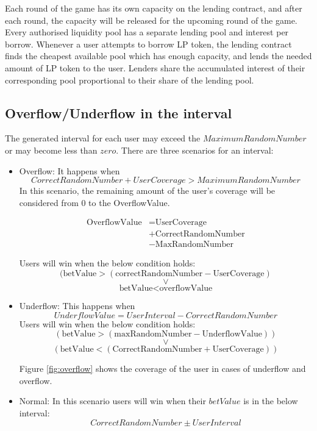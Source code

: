 \documentclass{article}
\begin{document}
Each round of the game has its own capacity on the lending contract, and after each round, the capacity will be released for the upcoming round of the game. Every authorised liquidity pool has a separate lending pool and interest per borrow. Whenever a user attempts to borrow LP token, the lending contract finds the cheapest available pool which has enough capacity, and lends the needed amount of LP token to the user.
Lenders share the accumulated interest of their corresponding pool proportional to their share of the lending pool.

\subsection{Overflow/Underflow in the interval}
The generated interval for each user may exceed the $Maximum Random Number$ or may become less than $zero$. There are three scenarios for an interval:
\begin{itemize}
    \item Overflow: It happens when
    $$CorrectRandomNumber + UserCoverage > MaximumRandomNumber$$ In this scenario, the remaining  amount of the user's coverage will be considered from 0 to the OverflowValue. 
    
    \begin{align*}
        \text{OverflowValue} &= \text{UserCoverage} \\ &+ \text{CorrectRandomNumber} \\ &-  \text{MaxRandomNumber}
    \end{align*}
    
    Users  will win when the below condition holds:
    $$(\text{betValue} > (\text{correctRandomNumber} - \text{UserCoverage})$$
    $$\lor$$
    $$
     \text{betValue} < \text{overflowValue}
    $$
    
    \item Underflow: This happens when 
    $$UnderflowValue = UserInterval - CorrectRandomNumber$$
    Users  will win when the below condition holds:
    $$
    (\text{betValue} > (\text{maxRandomNumber} - \text{UnderflowValue}))
    $$
    $$\lor$$
    $$
     (\text{betValue} < (\text{CorrectRandomNumber} + \text{UserCoverage}))
    $$
    
    Figure \ref{fig:overflow} shows the coverage of the user in cases of underflow and overflow.
    
    \item Normal: In this scenario users will win when their $betValue$ is in the below interval:
    $$
    {CorrectRandomNumber \pm{UserInterval}}
    $$
\end{itemize}
\end{document}
